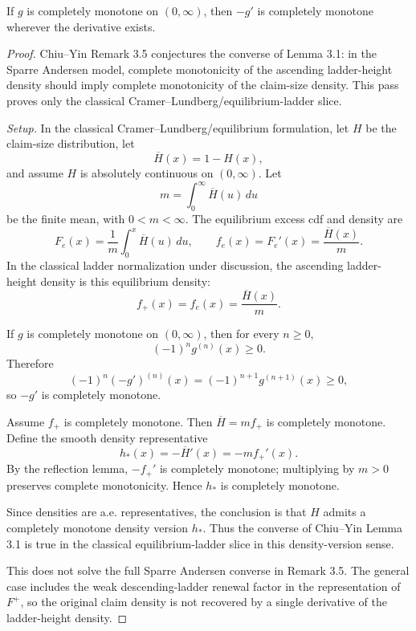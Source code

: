 \begin{proposition}
\label{res:chiu-yin-cm-derivative-reflection-lemma}
If \(g\) is completely monotone on \((0,\infty)\), then \(-g'\) is completely monotone wherever the derivative exists.
\end{proposition}
\begin{proof}
Chiu--Yin Remark 3.5 conjectures the converse of Lemma 3.1: in the Sparre Andersen model, complete monotonicity of the ascending ladder-height density should imply complete monotonicity of the claim-size density. This pass proves only the classical Cramer--Lundberg/equilibrium-ladder slice.

\emph{Setup.}
In the classical Cramer--Lundberg/equilibrium formulation, let \(H\) be the claim-size distribution, let
\[
\overline H(x)=1-H(x),
\]
and assume \(H\) is absolutely continuous on \((0,\infty)\). Let
\[
m=\int_0^\infty \overline H(u)\,du
\]
be the finite mean, with \(0<m<\infty\). The equilibrium excess cdf and density are
\[
F_e(x)=\frac1m\int_0^x\overline H(u)\,du,
\qquad
f_e(x)=F_e'(x)=\frac{\overline H(x)}{m}.
\]
In the classical ladder normalization under discussion, the ascending ladder-height density is this equilibrium density:
\[
f_+(x)=f_e(x)=\frac{\overline H(x)}{m}.
\]

If \(g\) is completely monotone on \((0,\infty)\), then for every \(n\ge0\),
\[
(-1)^n g^{(n)}(x)\ge0.
\]
Therefore
\[
(-1)^n(-g')^{(n)}(x)=(-1)^{n+1}g^{(n+1)}(x)\ge0,
\]
so \(-g'\) is completely monotone.

Assume \(f_+\) is completely monotone. Then \(\overline H=m f_+\) is completely monotone. Define the smooth density representative
\[
h_*(x)=-\overline H'(x)=-m f_+'(x).
\]
By the reflection lemma, \(-f_+'\) is completely monotone; multiplying by \(m>0\) preserves complete monotonicity. Hence \(h_*\) is completely monotone.

Since densities are a.e. representatives, the conclusion is that \(H\) admits a completely monotone density version \(h_*\). Thus the converse of Chiu--Yin Lemma 3.1 is true in the classical equilibrium-ladder slice in this density-version sense.

This does not solve the full Sparre Andersen converse in Remark 3.5. The general case includes the weak descending-ladder renewal factor in the representation of \(F^+\), so the original claim density is not recovered by a single derivative of the ladder-height density.
\end{proof}

